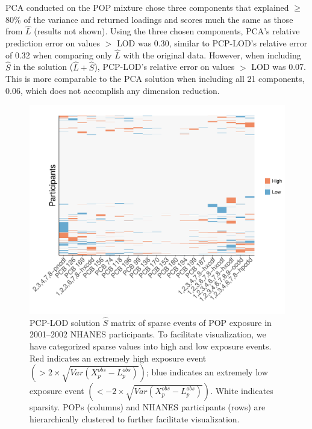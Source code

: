 PCA conducted on the POP mixture chose three components that explained $\ge$ 80\% of the variance and returned loadings and scores much the same as those from $\hat{L}$ (results not shown). Using the three chosen components, PCA's relative prediction error on values $>$ LOD was 0.30, similar to PCP-LOD's relative error of 0.32 when comparing only $\hat{L}$ with the original data. However, when including $\hat{S}$ in the solution ($\hat{L} + \hat{S}$), PCP-LOD's relative error on values $>$ LOD was 0.07. This is more comparable to the PCA solution when including all 21 components, 0.06, which does not accomplish any dimension reduction.

\begin{landscape}
\begin{figure}
    \centering
\includegraphics[scale=0.58]{figures/sparse_events.pdf}
   \caption{PCP-LOD solution $\hat{S}$ matrix of sparse events of POP exposure in 2001--2002 NHANES participants. To facilitate visualization, we have categorized sparse values into high and low exposure events. Red indicates an extremely high exposure event $\left(> 2 \times \sqrt{Var(X_{p}^{obs} - L_{p}^{obs})}\right)$; blue indicates an extremely low exposure event $\left(< -2 \times \sqrt{Var(X_{p}^{obs} - L_{p}^{obs})}\right)$. White indicates sparsity. POPs (columns) and NHANES participants (rows) are hierarchically clustered to further facilitate visualization.}
    \label{fig:sparse}
\end{figure}
\end{landscape}

